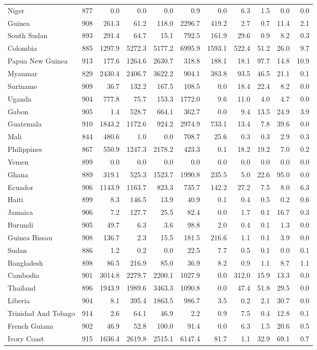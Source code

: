 \begin{center}
\begin{scriptsize}
\begin{longtable}[ht]{lrrrrrrrrrr}
			Niger&877&0.0&0.0&0.0&0.9&0.0&6.3&1.5&0.0&0.0\\
			Guinea&908&261.3&61.2&118.0&2296.7&419.2&2.7&0.7&11.4&2.1\\
			South Sudan&893&291.4&64.7&15.1&792.5&161.9&29.6&0.9&8.2&0.3\\
			Colombia&885&1297.9&5272.3&5177.2&6995.9&1593.1&522.4&51.2&26.0&9.7\\
			Papua New Guinea&913&177.6&1264.6&2630.7&318.8&188.1&18.1&97.7&14.8&10.9\\
			Myanmar&829&2430.4&2406.7&3622.2&904.1&383.8&93.5&46.5&21.1&0.1\\
			Suriname&909&36.7&132.2&167.5&108.5&0.0&18.4&22.4&8.2&0.0\\
			Uganda&904&777.8&75.7&153.3&1772.0&9.6&11.0&4.0&4.7&0.0\\
			Gabon&905&1.4&528.7&664.1&362.7&0.0&9.4&13.5&24.9&3.9\\
			Guatemala&910&1843.2&1172.6&924.2&2974.9&733.1&13.4&7.8&39.6&0.0\\
			Mali&844&480.6&1.0&0.0&708.7&25.6&0.3&0.3&2.9&0.3\\
			Philippines&867&550.9&1247.3&2178.2&423.3&0.1&18.2&19.2&7.0&0.2\\
			Yemen&899&0.0&0.0&0.0&0.0&0.0&0.0&0.0&0.0&0.0\\
			Ghana&889&319.1&525.3&1523.7&1990.8&235.5&5.0&22.6&95.0&0.0\\
			Ecuador&906&1143.9&1163.7&823.3&735.7&142.2&27.2&7.5&8.0&6.3\\
			Haiti&899&8.3&146.5&13.9&40.9&0.1&0.4&0.5&0.2&0.6\\
			Jamaica&906&7.2&127.7&25.5&82.4&0.0&1.7&0.1&16.7&0.3\\
			Burundi&905&49.7&6.3&3.6&98.8&2.0&0.4&0.1&1.3&0.0\\
			Guinea Bissau&908&136.7&2.3&15.5&181.5&216.6&1.1&0.1&3.9&0.0\\
			Sudan&886&1.2&0.2&0.0&22.5&7.7&0.5&0.1&0.0&0.1\\
			Bangladesh&898&86.5&216.9&85.0&36.9&8.2&0.9&1.1&8.7&1.1\\
			Cambodia&901&3014.8&2279.7&2200.1&1027.9&0.0&312.0&15.9&13.3&0.0\\
			Thailand&896&1943.9&1989.6&3463.3&1090.8&0.0&47.4&51.8&29.5&0.0\\
			Liberia&904&8.1&395.4&1863.5&986.7&3.5&0.2&2.1&30.7&0.0\\
			Trinidad And Tobago&914&2.6&64.1&46.9&2.2&0.9&7.5&0.4&12.8&0.1\\
			French Guiana&902&46.9&52.8&100.0&91.4&0.0&6.3&1.5&20.6&0.5\\
			Ivory Coast&915&1636.4&2619.8&2515.1&6147.4&81.7&1.1&32.9&69.1&0.7\\
		\end{longtable}
	\end{scriptsize}
	\end{center}
